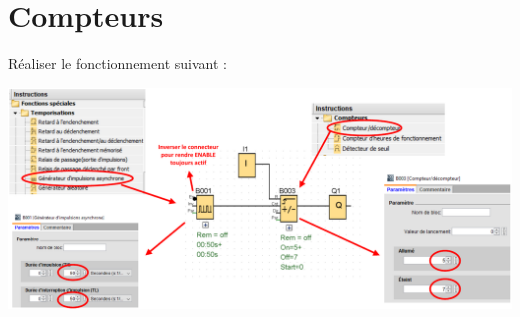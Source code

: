 \documentclass[11pt]{article}
\begin{document}
\pagebreak
\section{Compteurs}
\begin{UPSTIactivite}
    Réaliser le fonctionnement suivant : 

    \begin{center}
        \includegraphics[width=\textwidth]{images/logigrammeCompteur.png}
    \end{center}

\end{UPSTIactivite}
\pagebreak
\end{document}
